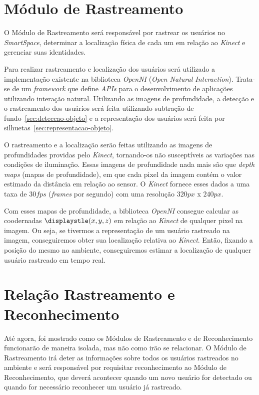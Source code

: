 \section{Módulo de Rastreamento}

	O Módulo de Rastreamento será responsável por rastrear os usuários no \textit{SmartSpace}, determinar a localização física de cada um em relação ao \textit{Kinect} e gerenciar suas identidades.

	Para realizar rastreamento e localização dos usuários será utilizado a implementação existente na biblioteca \textit{OpenNI} (\textit{Open Natural Interaction}). Trata-se de um \textit{framework} que define \textit{APIs} para o desenvolvimento de aplicações utilizando interação natural. Utilizando as imagens de profundidade, a detecção e o rastreamento dos usuários será feita utilizando subtração de fundo~\ref{sec:deteccao-objeto} e a representação dos usuários será feita por silhuetas~\ref{sec:representacao-objeto}. 

	O rastreamento e a localização serão feitas utilizando as imagens de profundidades providas pelo \textit{Kinect}, tornando-os não susceptíveis as variações nas condições de iluminação. Essas imagens de profundidade nada mais são que \textit{depth maps} (mapas de profundidade), em que cada pixel da imagem contém o valor estimado da distância em relação ao sensor. O \textit{Kinect} fornece esses dados a uma taxa de $\displaystyle 30 fps$ (\textit{frames} por segundo) com uma resolução $\displaystyle 320px$ x $\displaystyle 240px$.
	
	Com esses mapas de profundidade, a biblioteca \textit{OpenNI} consegue calcular as coodernadas $\displaystle (x,y,z)$ em relação ao \textit{Kinect} de qualquer pixel na imagem. Ou seja, se tivermos a representação de um usuário rastreado na imagem, conseguiremos obter sua localização relativa ao \textit{Kinect}. Então, fixando a posição do mesmo no ambiente, conseguiremos estimar a localização de qualquer usuário rastreado em tempo real.

\section{Relação Rastreamento e Reconhecimento}
\label{sec:rastreamento-reconhecimento}

	Até agora, foi mostrado como os Módulos de Rastreamento e de Reconhecimento funcionarão de maneira isolada, mas não como irão se relacionar. O Módulo de Rastreamento irá deter as informações sobre todos os usuários rastreados no ambiente e será responsável por requisitar reconhecimento ao Módulo de Reconhecimento, que deverá acontecer quando um novo usuário for detectado ou quando for necessário reconhecer um usuário já rastreado.

